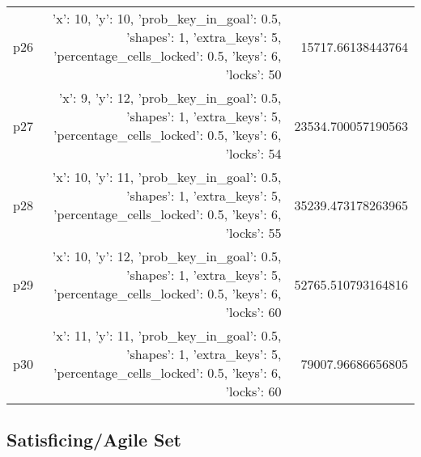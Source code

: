 \documentclass{article}
\begin{document}
\begin{center}
\begin{tabular}{r|r|r}
  p26&{'x': 10, 'y': 10, 'prob\_key\_in\_goal': 0.5, 'shapes': 1, 'extra\_keys': 5, 'percentage\_cells\_locked': 0.5, 'keys': 6, 'locks': 50}&15717.66138443764\\
  p27&{'x': 9, 'y': 12, 'prob\_key\_in\_goal': 0.5, 'shapes': 1, 'extra\_keys': 5, 'percentage\_cells\_locked': 0.5, 'keys': 6, 'locks': 54}&23534.700057190563\\
  p28&{'x': 10, 'y': 11, 'prob\_key\_in\_goal': 0.5, 'shapes': 1, 'extra\_keys': 5, 'percentage\_cells\_locked': 0.5, 'keys': 6, 'locks': 55}&35239.473178263965\\
  p29&{'x': 10, 'y': 12, 'prob\_key\_in\_goal': 0.5, 'shapes': 1, 'extra\_keys': 5, 'percentage\_cells\_locked': 0.5, 'keys': 6, 'locks': 60}&52765.510793164816\\
  p30&{'x': 11, 'y': 11, 'prob\_key\_in\_goal': 0.5, 'shapes': 1, 'extra\_keys': 5, 'percentage\_cells\_locked': 0.5, 'keys': 6, 'locks': 60}&79007.96686656805
                            \end{tabular}
                            \end{center}
                    

                                \subsection*{Satisficing/Agile Set}
                                
\end{document}
